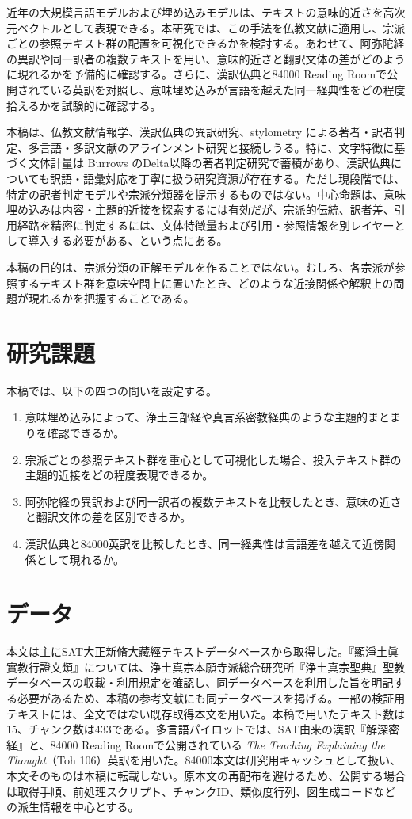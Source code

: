 \documentclass[uplatex,dvipdfmx,11pt,a4paper]{jsarticle}
\begin{document}
近年の大規模言語モデルおよび埋め込みモデルは、テキストの意味的近さを高次元ベクトルとして表現できる。本研究では、この手法を仏教文献に適用し、宗派ごとの参照テキスト群の配置を可視化できるかを検討する。あわせて、阿弥陀経の異訳や同一訳者の複数テキストを用い、意味的近さと翻訳文体の差がどのように現れるかを予備的に確認する。さらに、漢訳仏典と84000 Reading Roomで公開されている英訳を対照し、意味埋め込みが言語を越えた同一経典性をどの程度拾えるかを試験的に確認する。

本稿は、仏教文献情報学、漢訳仏典の異訳研究、stylometry による著者・訳者判定、多言語・多訳文献のアラインメント研究と接続しうる。特に、文字特徴に基づく文体計量は Burrows のDelta以降の著者判定研究で蓄積があり\cite{burrows2002,koppel2009}、漢訳仏典についても訳語・語彙対応を丁寧に扱う研究資源が存在する\cite{karashima2001}。ただし現段階では、特定の訳者判定モデルや宗派分類器を提示するものではない。中心命題は、意味埋め込みは内容・主題的近接を探索するには有効だが、宗派的伝統、訳者差、引用経路を精密に判定するには、文体特徴量および引用・参照情報を別レイヤーとして導入する必要がある、という点にある。

本稿の目的は、宗派分類の正解モデルを作ることではない。むしろ、各宗派が参照するテキスト群を意味空間上に置いたとき、どのような近接関係や解釈上の問題が現れるかを把握することである。

\section{研究課題}

本稿では、以下の四つの問いを設定する。

\begin{enumerate}
  \item 意味埋め込みによって、浄土三部経や真言系密教経典のような主題的まとまりを確認できるか。
  \item 宗派ごとの参照テキスト群を重心として可視化した場合、投入テキスト群の主題的近接をどの程度表現できるか。
  \item 阿弥陀経の異訳および同一訳者の複数テキストを比較したとき、意味の近さと翻訳文体の差を区別できるか。
  \item 漢訳仏典と84000英訳を比較したとき、同一経典性は言語差を越えて近傍関係として現れるか。
\end{enumerate}

\section{データ}

本文は主にSAT大正新脩大藏經テキストデータベースから取得した。『顯淨土眞實教行證文類』については、浄土真宗本願寺派総合研究所『浄土真宗聖典』聖教データベースの収載・利用規定を確認し、同データベースを利用した旨を明記する必要があるため、本稿の参考文献にも同データベースを掲げる。一部の検証用テキストには、全文ではない既存取得本文を用いた。本稿で用いたテキスト数は15、チャンク数は433である。多言語パイロットでは、SAT由来の漢訳『解深密経』と、84000 Reading Roomで公開されている \textit{The Teaching Explaining the Thought}（Toh 106）英訳を用いた。84000本文は研究用キャッシュとして扱い、本文そのものは本稿に転載しない。原本文の再配布を避けるため、公開する場合は取得手順、前処理スクリプト、チャンクID、類似度行列、図生成コードなどの派生情報を中心とする。
\end{document}
